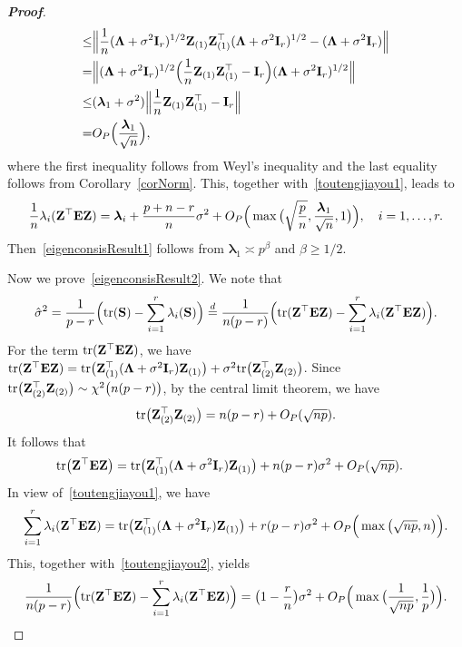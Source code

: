 \documentclass[times,sort&compress,3p]{elsarticle}
\newcommand{\mytr}{ {\rm tr} }
\newcommand{\bZ}{\mathbf{Z}}
\newcommand{\bfsym}[1]{\ensuremath{\boldsymbol{#1}}}
\def\blambda {\bfsym {\lambda}}        \def\bLambda {\bfsym {\Lambda}}
\theoremstyle{plain}
\theoremstyle{definition}
\theoremstyle{remark}
\begin{document}
\begin{appendices}
\begin{proof}[\textbf{Proof}]
$$\begin{aligned}
        \leq &
        \Big\|
        \frac{1}{n}(\bLambda+\sigma^2 \BI_r)^{1/2}\bZ_{(1)}\bZ_{(1)}^\top (\bLambda+\sigma^2 \BI_r)^{1/2}
        -(\bLambda+\sigma^2 \BI_r)
        \Big\|\\
        = &
        \Big\|
        (\bLambda+\sigma^2 \BI_r)^{1/2}\Big(\frac{1}{n}\bZ_{(1)}\bZ_{(1)}^\top -\BI_r\Big)(\bLambda+\sigma^2 \BI_r)^{1/2}
        \Big\|\\
        \leq &
        (\blambda_1 + \sigma^2)
        \Big\|\frac{1}{n}\bZ_{(1)}\bZ_{(1)}^\top -\BI_r\Big\|\\
        = &
        O_P\Big(\frac{\blambda_1}{\sqrt{n}}\Big),
    \end{aligned}
    $$
    where the first inequality follows from Weyl's inequality and the last equality follows from Corollary~\ref{corNorm}.
    This, together with~\eqref{toutengjiayou1}, leads to
$$
\frac{1}{n}\lambda_i(\BZ^\top  \BE \BZ)=
\blambda_i+\frac{p+n-r}{n}\sigma^2+O_P\Big(\max\big(\sqrt{\frac{p}{n}},\frac{\blambda_1}{\sqrt{n}},1\big)\Big),\quad i=1,\ldots, r.
$$
Then~\eqref{eigenconsisResult1} follows from $\blambda_1\asymp p^{\beta}$ and $\beta\geq 1/2$.
    
    Now we prove~\eqref{eigenconsisResult2}.
    We note that
    $$
    \hat{\sigma}^2=\frac{1}{p-r}\Big(\mytr(\BS)-\sum_{i=1}^r \lambda_i(\BS)\Big)
    \overset{d}{=}
\frac{1}{n(p-r)}\Big(\mytr(\BZ^\top  \BE \BZ)-\sum_{i=1}^r \lambda_i(\BZ^\top  \BE \BZ)\Big).
    $$
    For the term $\mytr(\BZ^\top  \BE \BZ)$, we have
    $
            \mytr(\bZ^\top  \BE \bZ)= \mytr\big(\bZ_{(1)}^\top  (\bLambda +\sigma^2 \BI_r) \bZ_{(1)}\big)+
       \sigma^2 \mytr\big( \bZ_{(2)}^\top   \bZ_{(2)}\big)
    $.
    Since $\mytr\big( \bZ_{(2)}^\top   \bZ_{(2)}\big)\sim \chi^2\big( n(p-r)\big)$, by the central limit theorem, we have
    $$\mytr\big( \bZ_{(2)}^\top   \bZ_{(2)}\big)=n(p-r)+O_P(\sqrt{np}).$$
    It follows that
    \begin{equation}\label{toutengjiayou2}
        \begin{aligned}
            \mytr\big(\bZ^\top  \BE \bZ\big)&= \mytr\big(\bZ_{(1)}^\top  (\bLambda +\sigma^2 \BI_r) \bZ_{(1)}\big)+
            n(p-r)\sigma^2+O_P(\sqrt{np}).
        \end{aligned}
    \end{equation}
    In view of~\eqref{toutengjiayou1}, we have
    $$
\sum_{i=1}^r\lambda_i(\BZ^\top  \BE \BZ)
=\mytr\big(\BZ_{(1)}^\top  (\bLambda+\sigma^2 \BI_r)\BZ_{(1)}\big)
+r(p-r)\sigma^2
+
O_P\Big(\max\big(\sqrt{np},n\big)\Big).
    $$
    This, together with~\eqref{toutengjiayou2}, yields
    $$
\frac{1}{n(p-r)}\Big(\mytr(\BZ^\top  \BE \BZ)-\sum_{i=1}^r \lambda_i(\BZ^\top  \BE \BZ)\Big)=
\big(1-\frac{r}{n}\big)\sigma^2+
O_P\Big(\max\big(\frac{1}{\sqrt{np}},\frac{1}{p}\big)\Big).
    $$
\end{proof}


\end{appendices}
\end{document}
